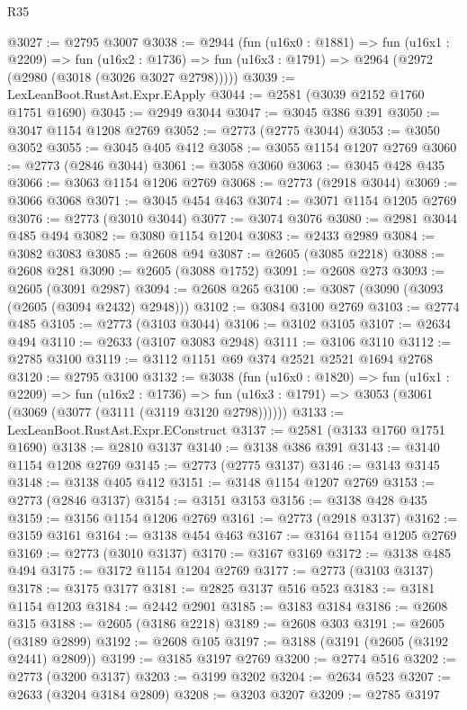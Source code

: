 \begin{lexlean}{R35}
\begin{coremodule}
@3027 := @2795 @3007
@3038 := @2944
    (fun (u16x0 : @1881) =>
    fun (u16x1 : @2209) =>
    fun (u16x2 : @1736) => fun (u16x3 : @1791) => @2964 (@2972 (@2980 (@3018 (@3026 @3027 @2798)))))
@3039 := LexLeanBoot.RustAst.Expr.EApply
@3044 := @2581 (@3039 @2152 @1760 @1751 @1690)
@3045 := @2949 @3044
@3047 := @3045 @386 @391
@3050 := @3047 @1154 @1208 @2769
@3052 := @2773 (@2775 @3044)
@3053 := @3050 @3052
@3055 := @3045 @405 @412
@3058 := @3055 @1154 @1207 @2769
@3060 := @2773 (@2846 @3044)
@3061 := @3058 @3060
@3063 := @3045 @428 @435
@3066 := @3063 @1154 @1206 @2769
@3068 := @2773 (@2918 @3044)
@3069 := @3066 @3068
@3071 := @3045 @454 @463
@3074 := @3071 @1154 @1205 @2769
@3076 := @2773 (@3010 @3044)
@3077 := @3074 @3076
@3080 := @2981 @3044 @485 @494
@3082 := @3080 @1154 @1204
@3083 := @2433 @2989
@3084 := @3082 @3083
@3085 := @2608 @94
@3087 := @2605 (@3085 @2218)
@3088 := @2608 @281
@3090 := @2605 (@3088 @1752)
@3091 := @2608 @273
@3093 := @2605 (@3091 @2987)
@3094 := @2608 @265
@3100 := @3087 (@3090 (@3093 (@2605 (@3094 @2432) @2948)))
@3102 := @3084 @3100 @2769
@3103 := @2774 @485
@3105 := @2773 (@3103 @3044)
@3106 := @3102 @3105
@3107 := @2634 @494
@3110 := @2633 (@3107 @3083 @2948)
@3111 := @3106 @3110
@3112 := @2785 @3100
@3119 := @3112 @1151 @69 @374 @2521 @2521 @1694 @2768
@3120 := @2795 @3100
@3132 := @3038
    (fun (u16x0 : @1820) =>
    fun (u16x1 : @2209) =>
    fun (u16x2 : @1736) =>
    fun (u16x3 : @1791) => @3053 (@3061 (@3069 (@3077 (@3111 (@3119 @3120 @2798))))))
@3133 := LexLeanBoot.RustAst.Expr.EConstruct
@3137 := @2581 (@3133 @1760 @1751 @1690)
@3138 := @2810 @3137
@3140 := @3138 @386 @391
@3143 := @3140 @1154 @1208 @2769
@3145 := @2773 (@2775 @3137)
@3146 := @3143 @3145
@3148 := @3138 @405 @412
@3151 := @3148 @1154 @1207 @2769
@3153 := @2773 (@2846 @3137)
@3154 := @3151 @3153
@3156 := @3138 @428 @435
@3159 := @3156 @1154 @1206 @2769
@3161 := @2773 (@2918 @3137)
@3162 := @3159 @3161
@3164 := @3138 @454 @463
@3167 := @3164 @1154 @1205 @2769
@3169 := @2773 (@3010 @3137)
@3170 := @3167 @3169
@3172 := @3138 @485 @494
@3175 := @3172 @1154 @1204 @2769
@3177 := @2773 (@3103 @3137)
@3178 := @3175 @3177
@3181 := @2825 @3137 @516 @523
@3183 := @3181 @1154 @1203
@3184 := @2442 @2901
@3185 := @3183 @3184
@3186 := @2608 @315
@3188 := @2605 (@3186 @2218)
@3189 := @2608 @303
@3191 := @2605 (@3189 @2899)
@3192 := @2608 @105
@3197 := @3188 (@3191 (@2605 (@3192 @2441) @2809))
@3199 := @3185 @3197 @2769
@3200 := @2774 @516
@3202 := @2773 (@3200 @3137)
@3203 := @3199 @3202
@3204 := @2634 @523
@3207 := @2633 (@3204 @3184 @2809)
@3208 := @3203 @3207
@3209 := @2785 @3197

\end{coremodule}
\end{lexlean}
